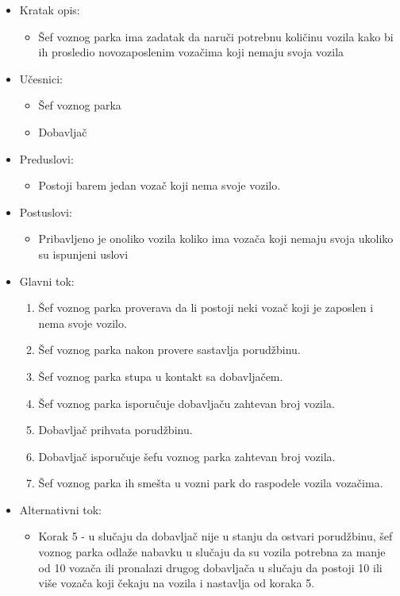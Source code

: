 \begin{itemize}
	\item Kratak opis:
		\begin{itemize}
			\item Šef voznog parka ima zadatak da naruči potrebnu količinu vozila kako bi ih prosledio novozaposlenim vozačima koji nemaju svoja vozila
		\end{itemize}
	\item Učesnici:
		\begin{itemize}
		    \item Šef voznog parka
			\item Dobavljač
		\end{itemize}
	\item Preduslovi:
		\begin{itemize}
		    \item Postoji barem jedan vozač koji nema svoje vozilo.
		\end{itemize}
	\item Postuslovi:
		\begin{itemize}
			\item Pribavljeno je onoliko vozila koliko ima vozača koji nemaju svoja ukoliko su ispunjeni uslovi
	\end{itemize}
	\item Glavni tok:
		\begin{enumerate}
		    \item Šef voznog parka proverava da li postoji neki vozač koji je zaposlen i nema svoje vozilo.
		    \item Šef voznog parka nakon provere sastavlja porudžbinu.
		    \item Šef voznog parka stupa u kontakt sa dobavljačem.
			\item Šef voznog parka isporučuje dobavljaču zahtevan broj vozila.
			\item Dobavljač prihvata porudžbinu.
			\item Dobavljač isporučuje šefu voznog parka zahtevan broj vozila.
			\item Šef voznog parka ih smešta u vozni park do raspodele vozila vozačima.
		\end{enumerate}
	\item Alternativni tok:
		\begin{itemize}
		    \item Korak 5 - u slučaju da dobavljač nije u stanju da ostvari porudžbinu, šef voznog parka odlaže nabavku u slučaju da su vozila potrebna za manje od 10 vozača ili pronalazi drugog dobavljača u slučaju da postoji 10 ili više vozača koji čekaju na vozila i nastavlja od koraka 5.
		\end{itemize}
\end{itemize}



